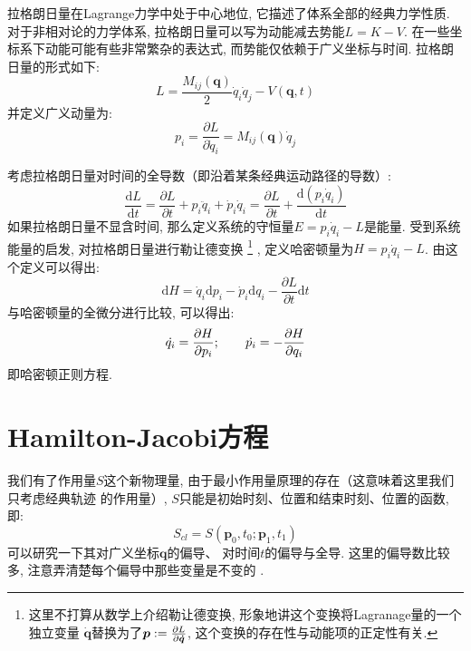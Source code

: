         拉格朗日量在Lagrange力学中处于中心地位, 它描述了体系全部的经典力学性质. 
        对于非相对论的力学体系, 拉格朗日量可以写为动能减去势能$L = K - V$. 
        在一些坐标系下动能可能有些非常繁杂的表达式, 而势能仅依赖于广义坐标与时间. 
        拉格朗日量的形式如下: 
        \begin{equation}
            L =  \frac{M_{ij}(\bm q)}{2} \dot q_i \dot q_j  - V(\bm q, t)
        \end{equation}
        并定义广义动量为: 
        \begin{equation}
            p_i =\frac{\partial L}{\partial \dot q_i} = M_{ij}(\bm q) \dot q_j
        \end{equation}

        \splitline

        考虑拉格朗日量对时间的全导数（即沿着某条经典运动路径的导数）:
        \begin{equation}
            \frac{\mathrm{d} L}{\mathrm{d} t} = \frac{\partial L}{\partial t} + p_i \ddot q_i + \dot p_i \dot q_i = \frac{\partial L}{\partial t} +  \frac{\mathrm{d} (p_i \dot q_i)}{\mathrm{d} t}
        \end{equation}
        如果拉格朗日量不显含时间, 那么定义系统的守恒量$E = p_i \dot q_i - L$是能量. 
        受到系统能量的启发, 对拉格朗日量进行勒让德变换
        \footnote{这里不打算从数学上介绍勒让德变换, 形象地讲这个变换将Lagranage量的一个独立变量
        $\bm{\dot{q}}$替换为了$\bm{p}:=\frac{\partial{L}}{\partial{\bm{\dot{q}}}}$, 这个变换的存在性与动能项的正定性有关. }
        , 定义哈密顿量为$H = p_i \dot q_i - L$. 
        由这个定义可以得出:
        \begin{equation}
            \mathrm{d} H = \dot q_i \mathrm{d} p_i - \dot p_i \mathrm{d} q_i - \frac{\partial L}{\partial t} \mathrm{d} t
        \end{equation}
        与哈密顿量的全微分进行比较, 可以得出:
        \begin{equation}
            \dot{q_{i}} = \frac{\partial{H}}{\partial{p_i}};
            \qquad
            \dot{p_{i}} = -\frac{\partial{H}}{\partial{q_i}}
        \end{equation}
        即哈密顿正则方程.

        \section{Hamilton-Jacobi方程}
        我们有了作用量$S$这个新物理量, 由于最小作用量原理的存在（这意味着这里我们只考虑经典轨迹
        的作用量）, $S$只能是初始时刻、位置和结束时刻、位置的函数, 即:
        \begin{equation}
            S_{cl} = S(\bm{p}_0, t_0; \bm{p}_1, t_1)
        \end{equation}
        可以研究一下其对广义坐标$\bm q$的偏导、
        对时间$t$的偏导与全导. 这里的偏导数比较多, 注意弄清楚每个偏导中那些变量是不变的
        . 

